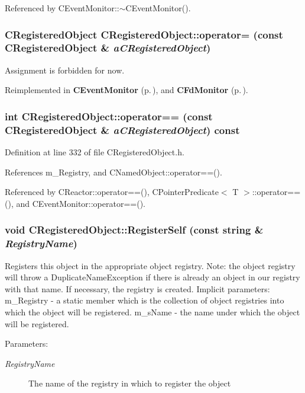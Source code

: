 Referenced by CEvent\-Monitor::$\sim$CEvent\-Monitor().
\subsubsection{\setlength{\rightskip}{0pt plus 5cm}CRegistered\-Object CRegistered\-Object::operator= (const CRegistered\-Object \& {\em a\-CRegistered\-Object})\hspace{0.3cm}{\tt  [private]}}\label{classCRegisteredObject_c1}


Assignment is forbidden for now.



Reimplemented in {\bf CEvent\-Monitor} {\rm (p.\,\pageref{classCEventMonitor_c1})}, and {\bf CFd\-Monitor} {\rm (p.\,\pageref{classCFdMonitor_c1})}.
\subsubsection{\setlength{\rightskip}{0pt plus 5cm}int CRegistered\-Object::operator== (const CRegistered\-Object \& {\em a\-CRegistered\-Object}) const\hspace{0.3cm}{\tt  [inline]}}\label{classCRegisteredObject_a1}




Definition at line 332 of file CRegistered\-Object.h.

References m\_\-Registry, and CNamed\-Object::operator==().

Referenced by CReactor::operator==(), CPointer\-Predicate$<$ T $>$::operator==(), and CEvent\-Monitor::operator==().
\subsubsection{\setlength{\rightskip}{0pt plus 5cm}void CRegistered\-Object::Register\-Self (const string \& {\em Registry\-Name})}\label{classCRegisteredObject_a4}


Registers this object in the appropriate object registry. Note: the object registry will throw a Duplicate\-Name\-Exception if there is already an object in our registry with that name. If necessary, the registry is created. Implicit parameters: m\_\-Registry - a static member which is the collection of object registries into which the object will be registered. m\_\-s\-Name - the name under which the object will be registered.\begin{Desc}
\item[Parameters: ]\par
\begin{description}
\item[{\em 
Registry\-Name}]The name of the registry in which to register the object \end{description}
\end{Desc}


